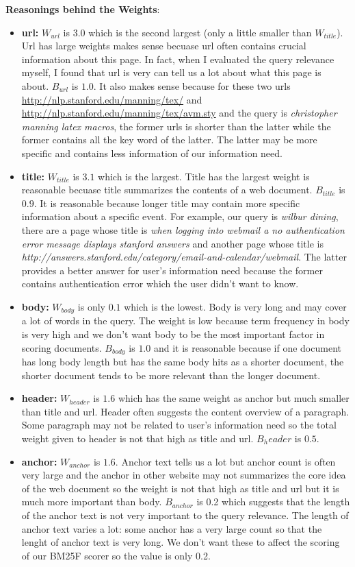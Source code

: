 \documentclass{article}
\begin{document}
\textbf{Reasonings behind the Weights}:

\begin{itemize}
  \item \textbf{url:} $W_{url}$ is $3.0$ which is the second largest (only a little smaller than $W_{title}$). Url has large weights makes sense becuase url often contains crucial information about this page. In fact, when I evaluated the query relevance myself, I found that url is very can tell us a lot about what this page is about. $B_{url}$ is $1.0$. It also makes sense because for these two urls \url{http://nlp.stanford.edu/manning/tex/} and \url{http://nlp.stanford.edu/manning/tex/avm.sty} and the query is \textit{christopher manning latex macros}, the former urls is shorter than the latter while the former contains all the key word of the latter. The latter may be more specific and contains less information of our information need.
  \item \textbf{title:} $W_{title}$ is $3.1$ which is the largest. Title has the largest weight is reasonable becuase title summarizes the contents of a web document. $B_{title}$ is $0.9$. It is reasonable because longer title may contain more specific information about a specific event. For example, our query is \textit{ wilbur dining}, there are a page whose title is \textit{when logging into webmail a no authentication error message displays stanford answers} and another page whose title is \textit{http://answers.stanford.edu/category/email-and-calendar/webmail}. The latter provides a better answer for user's information need because the former contains authentication error which the user didn't want to know.
  \item \textbf{body:} $W_{body}$ is only $0.1$ which is the lowest. Body is very long and may cover a lot of words in the query. The weight is low because term frequency in body is very high and we don't want body to be the most important factor in scoring documents. $B_{body}$ is $1.0$ and it is reasonable because if one document has long body length but has the same body hits as a shorter document, the shorter document tends to be more relevant than the longer document.
  \item \textbf{header:} $W_{header}$ is $1.6$ which has the same weight as anchor but much smaller than title and url. Header often suggests the content overview of a paragraph. Some paragraph may not be related to user's information need so the total weight given to header is not that high as title and url. $B_header$ is $0.5$.
  \item \textbf{anchor:} $W_{anchor}$ is $1.6$. Anchor text tells us a lot but anchor count is often very large and the anchor in other website may not summarizes the core idea of the web document so the weight is not that high as title and url but it is much more important than body. $B_{anchor}$ is 0.2 which suggests that the length of the anchor text is not very important to the query relevance. The length of anchor text varies a lot: some anchor has a very large count so that the lenght of anchor text is very long. We don't want these to affect the scoring of our BM25F scorer so the value is only 0.2.
\end{itemize}
\end{document}
